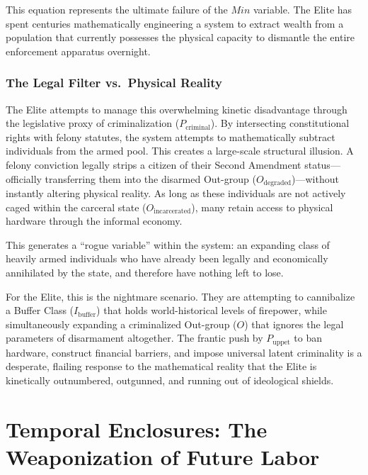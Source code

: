 This equation represents the ultimate failure of the $Min$ variable. The Elite has spent centuries mathematically engineering a system to extract wealth from a population that currently possesses the physical capacity to dismantle the entire enforcement apparatus overnight.

\subsubsection*{The Legal Filter vs.\ Physical Reality}

The Elite attempts to manage this overwhelming kinetic disadvantage through the legislative proxy of criminalization ($P_{\text{criminal}}$). By intersecting constitutional rights with felony statutes, the system attempts to mathematically subtract individuals from the armed pool. This creates a large-scale structural illusion. A felony conviction legally strips a citizen of their Second Amendment status---officially transferring them into the disarmed Out-group ($O_{\text{degraded}}$)---without instantly altering physical reality. As long as these individuals are not actively caged within the carceral state ($O_{\text{incarcerated}}$), many retain access to physical hardware through the informal economy.

This generates a ``rogue variable'' within the system: an expanding class of heavily armed individuals who have already been legally and economically annihilated by the state, and therefore have nothing left to lose.

For the Elite, this is the nightmare scenario. They are attempting to cannibalize a Buffer Class ($I_{\text{buffer}}$) that holds world-historical levels of firepower, while simultaneously expanding a criminalized Out-group ($O$) that ignores the legal parameters of disarmament altogether. The frantic push by $P_{\text{uppet}}$ to ban hardware, construct financial barriers, and impose universal latent criminality is a desperate, flailing response to the mathematical reality that the Elite is kinetically outnumbered, outgunned, and running out of ideological shields.


\section{Temporal Enclosures: The Weaponization of Future Labor}
\label{sec:temporal_enclosures}

